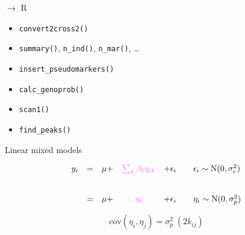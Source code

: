 \documentclass[12pt]{article}
\newcommand{\headsize}{\fontsize{35}{35} \selectfont}
\newcommand{\textsize}{\fontsize{30}{35} \selectfont}
\newcommand{\smallsize}{\fontsize{25}{30} \selectfont}
\begin{document}
\headsize \color{myyellow}
$\boldsymbol{\rightarrow}$ R

\vspace{3cm}

\color{mywhite} \smallsize

\hfill \begin{minipage}[t]{9.5in}
\begin{itemize}
\itemsep24pt
\item \verb|convert2cross2()|
\item \verb|summary()|, \verb|n_ind()|, \verb|n_mar()|, \dots
\item \verb|insert_pseudomarkers()|
\item \verb|calc_genoprob()|
\item \verb|scan1()|
\item \verb|find_peaks()|
\end{itemize} \end{minipage}


\newpage

\headsize \color{myyellow}
\hfill\begin{minipage}{5.75in}
\centering
Linear mixed models
\end{minipage}


\vspace{3cm}

\color{mywhite} \textsize

$$\begin{array}{lllcl@{\qquad}l}
  y_i & = & \mu + & \textstyle{{\color{mypink} \sum_k \beta_k q_{ik}}} & + \epsilon_i
               & \epsilon_i \sim \text{N}(0, \sigma^2_e) \\[24pt]
  & = & \mu + & {\color{mypink} \eta_i} & + \epsilon_i & \eta_i \sim \text{N}(0, \sigma^2_p)
\end{array}$$

\vspace{2cm}

$$\text{cov}(\eta_i, \eta_j) = \sigma^2_p \; (2 k_{ij})$$
\end{document}
